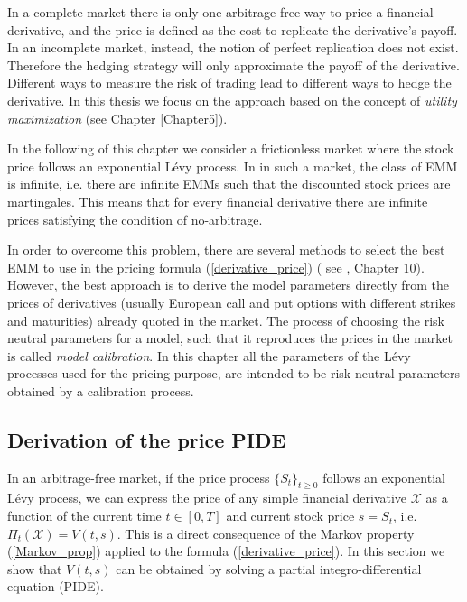 In a complete market there is only one arbitrage-free way to price a financial derivative, and the price is defined as the cost to replicate the derivative's payoff.
In an incomplete market, instead, the notion of perfect replication does not exist. 
Therefore the hedging strategy will only approximate the payoff of the derivative. Different ways to measure the risk of trading lead to different 
ways to hedge the derivative. In this thesis we focus on the approach based on the concept of \emph{utility maximization} (see Chapter \ref{Chapter5}).

In the following of this chapter we consider a frictionless market where the stock price follows an exponential Lévy process. 
In in such a market, the class of EMM is infinite, 
i.e. there are infinite EMMs such that the discounted stock prices are martingales.
This means that for every financial derivative there are infinite prices satisfying the condition of no-arbitrage. 

In order to overcome this problem, there are several methods to select the best EMM to use in the pricing formula (\ref{derivative_price}) (
see \cite{Cont}, Chapter 10).
However, the best approach is to derive the model parameters directly from the prices of derivatives (usually European call and put options with different strikes and maturities) 
already quoted in the market.
The process of choosing the risk neutral parameters for a model, such that it reproduces the prices in the market is called \emph{model calibration}.
In this chapter all the parameters of the Lévy processes used for the pricing purpose, are intended to be risk neutral parameters obtained by a calibration process.





\subsection{Derivation of the price PIDE}

In an arbitrage-free market, if the price process $\{S_t\}_{t\geq0}$ follows an exponential Lévy process, 
we can express the price of any simple financial derivative $\mathcal{X}$ as a function of the current time 
$t \in [0,T]$ and current stock price $s=S_t$, i.e. $\Pi_t(\mathcal{X}) = V(t,s)$.
This is a direct consequence of the Markov property (\ref{Markov_prop}) applied to the formula (\ref{derivative_price}).
In this section we show that $V(t,s)$ can be obtained by solving a partial integro-differential equation (PIDE).

